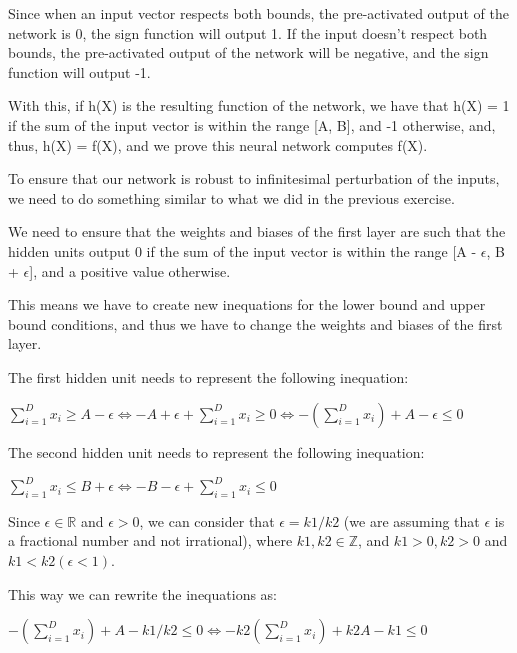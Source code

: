 \documentclass{article}
\begin{document}
Since when an input vector respects both bounds, the pre-activated output of the network is 0, the sign function will output 1. If the input doesn't
respect both bounds, the pre-activated output of the network will be negative, and the sign function will output -1.

With this, if h(X) is the resulting function of the network, we have that h(X) = 1 if the sum of the input vector is within the range [A, B], 
and -1 otherwise, and, thus, h(X) = f(X), and we prove this neural network computes f(X).

\bigskip

To ensure that our network is robust to infinitesimal perturbation of the inputs, we need to do something similar to what we did in the previous exercise.

We need to ensure that the weights and biases of the first layer are such that the hidden units output 0 if the sum of the input vector is 
within the range [A - $\epsilon$, B + $\epsilon$], and a positive value otherwise.

This means we have to create new inequations for the lower bound and upper bound conditions, 
and thus we have to change the weights and biases of the first layer.

\bigskip

The first hidden unit needs to represent the following inequation:

\bigskip

$ \sum_{i=1}^{D} x_i \geq A - \epsilon \iff -A + \epsilon + \sum_{i=1}^{D} x_i \geq 0 
\iff -(\sum_{i=1}^{D} x_i) + A - \epsilon \leq 0$

\bigskip

The second hidden unit needs to represent the following inequation:

\bigskip

$ \sum_{i=1}^{D} x_i \leq B + \epsilon \iff -B - \epsilon + \sum_{i=1}^{D} x_i \leq 0$

\bigskip

Since $\epsilon \in \mathbb{R}$ and $\epsilon > 0$, we can consider that $\epsilon = k1/k2$ (we are assuming that $\epsilon$
is a fractional number and not irrational), where $k1, k2 \in \mathbb{Z}$, and $k1 > 0, k2 > 0$ and $k1 < k2 (\epsilon < 1)$.

\bigskip

This way we can rewrite the inequations as:

\bigskip

$ -(\sum_{i=1}^{D} x_i) + A - k1/k2 \leq 0 \iff -k2(\sum_{i=1}^{D} x_i) + k2A - k1 \leq 0$
\end{document}
